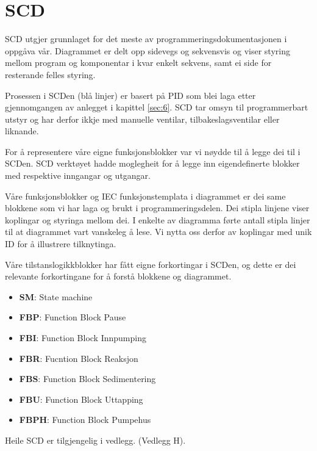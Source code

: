 \newpage
\section{SCD}
\thispagestyle{fancy}


\gls{SCD} utgjer grunnlaget for det meste av programmeringsdokumentasjonen i oppgåva vår.
Diagrammet er delt opp sidevegs og sekvensvis og viser styring mellom program og komponentar i kvar enkelt sekvens,
samt ei side for resterande felles styring.

Prosessen i \gls{SCD}en (blå linjer) er basert på \gls{PID} som blei laga etter gjennomgangen av anlegget i kapittel \ref{sec:6}.
\gls{SCD} tar omsyn til programmerbart utstyr og har derfor ikkje med manuelle ventilar, tilbakeslagsventilar eller liknande.

For å representere våre eigne funksjonsblokker var vi nøydde til å legge dei til i \gls{SCD}en.
\gls{SCD} verktøyet hadde moglegheit for å legge inn eigendefinerte blokker med respektive inngangar og utgangar.

Våre funksjonsblokker og \gls{IEC} funksjonstemplata i diagrammet er dei same blokkene som vi har laga og brukt i programmeringsdelen. 
Dei stipla linjene viser koplingar og styringa mellom dei. \newline
I enkelte av diagramma førte antall stipla linjer til at diagrammet vart vanskeleg å lese. Vi nytta oss derfor av koplingar med
unik ID for å illustrere tilknytinga.

Våre tilstanslogikkblokker har fått eigne forkortingar i \gls{SCD}en,  og dette er dei relevante forkortingane 
for å forstå blokkene og diagrammet.

\begin{itemize}
    \item \textbf{SM}:   State machine
    \item \textbf{FBP}:  Function Block Pause
    \item \textbf{FBI}:  Function Block Innpumping
    \item \textbf{FBR}:  Fucntion Block Reaksjon
    \item \textbf{FBS}:  Function Block Sedimentering
    \item \textbf{FBU}:  Function Block Uttapping
    \item \textbf{FBPH}: Function Block Pumpehus
\end{itemize}

Heile \gls{SCD} er tilgjengelig i vedlegg. (Vedlegg H). \newline
\newpage


